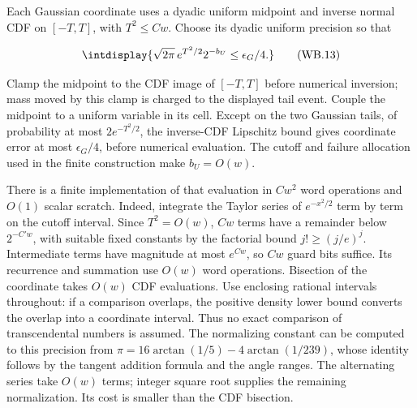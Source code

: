 \mbox{}\par\smallskip


Each Gaussian coordinate uses a dyadic uniform midpoint and inverse normal CDF on \([-T,\allowbreak T]\), with \(T^2\le Cw\). Choose its dyadic uniform precision so that


\begingroup\renewcommand{\theHequation}{intdisplay.795}
\begin{equation}
\intdisplay{
\sqrt{2\pi}\,e^{T^2/2}2^{-b_U}
\le\epsilon_G/4.
}
\tag{WB.13}
\label{int:eq-0385-wb-13}
\end{equation}
\endgroup


Clamp the midpoint to the CDF image of \([-T,\allowbreak T]\) before numerical inversion; mass moved by this clamp is charged to the displayed tail event. Couple the midpoint to a uniform variable in its cell. Except on the two Gaussian tails, of probability at most \(2e^{-T^2/2}\), the inverse-CDF Lipschitz bound gives coordinate error at most \(\epsilon_G/4\), before numerical evaluation. The cutoff and failure allocation used in the finite construction make \(b_U=O(w)\).



There is a finite implementation of that evaluation in \(Cw^2\) word operations and \(O(1)\) scalar scratch. Indeed, integrate the Taylor series of \(e^{-x^2/2}\) term by term on the cutoff interval. Since \(T^2=O(w)\), \(Cw\) terms have a remainder below \(2^{-C'w}\), with suitable fixed constants by the factorial bound \(j!\ge(j/e)^j\). Intermediate terms have magnitude at most \(e^{Cw}\), so \(Cw\) guard bits suffice. Its recurrence and summation use \(O(w)\) word operations. Bisection of the coordinate takes \(O(w)\) CDF evaluations. Use enclosing rational intervals throughout: if a comparison overlaps, the positive density lower bound converts the overlap into a coordinate interval. Thus no exact comparison of transcendental numbers is assumed. The normalizing constant can be computed to this precision from \(\pi=16\arctan(1/5)-4\arctan(1/239)\), whose identity follows by the tangent addition formula and the angle ranges. The alternating series take \(O(w)\) terms; integer square root supplies the remaining normalization. Its cost is smaller than the CDF bisection.



